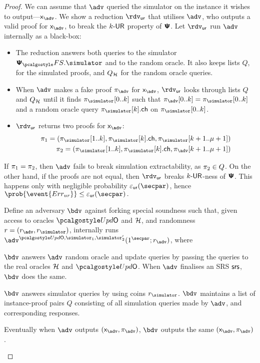 \begin{proof}
{  We can assume that $\advse$ queried the simulator on the instance it wishes to
  output---$\inp_{\advse}$. We show a reduction $\rdvur$ that utilises $\advse$,
  who outputs a valid proof for $\inp_{\advse}$, to break the ${k\text{-}\mathsf{UR}}$ property of
  $\bm{\mathsf{\Psi}}$. Let $\rdvur$ run $\advse$ internally as a black-box:
\begin{itemize}
	\item The reduction answers both queries to the simulator $\psfs.\simulator$ and to the random oracle. 
	It also keeps lists $Q$, for the simulated proofs, and $Q_{\mathcal{H}}$ for the random oracle queries. 
\item When $\advse$ makes a fake proof $\zkproof_{\advse}$ for $\inp_{\advse}$,
  $\rdvur$ looks through lists $Q$ and $Q_{\mathcal{H}}$ until it finds
  $\zkproof_{\simulator}[0..k]$ such that
  $\zkproof_{\advse}[0..k] = \zkproof_{\simulator}[0..k]$
  and a random oracle query $\zkproof_{\simulator}[k].\ch$ on
  $\zkproof_{\simulator}[0..k]$.
	\item $\rdvur$ returns two proofs for $\inp_{\advse}$:
	\begin{align*}
		\zkproof_1 = (\zkproof_{\simulator}[1..k],
		\zkproof_{\simulator}[k].\ch, \zkproof_{\simulator}[k + 1..\mu + 1])\\
		\zkproof_2 = (\zkproof_{\simulator}[1..k],
		\zkproof_{\simulator}[k].\ch, \zkproof_{\advse}[k + 1..\mu + 1])
	\end{align*}
	\end{itemize}  
	If $\pi_1 = \pi_2$, then $\advse$ fails to break simulation
  extractability, as $\pi_2 \in Q$. On the other hand, if the proofs are
  not equal, then $\rdvur$ breaks ${k\text{-}\mathsf{UR}}$-ness of $\bm{\mathsf{\Psi}}$. This happens only with
  negligible probability $\epsur(\secpar)$, hence \( \prob{\event{\errur}} \leq
  \epsur(\secpar)\,. \)
}
%
 Define an adversary $\bdv$ against forking special soundness such that,
given access to oracles $\initU$ and $\mathcal{H}$, and randomness $r = (r_\adv, \rsim)$,
internally runs $\advse^{\initU, \simulator_1, \simulator_2'} (1^\secpar; r_\adv)$,
where
\begin{compactenum}
\item $\bdv$ answers $\adv$ random oracle and update queries by passing the queries to the real
  oracles $\mathcal{H}$ and $\initU$. When $\adv$ finalises an SRS $\mathsf{srs}$, $\bdv$ does the same.
\item $\bdv$ answers simulator queries by using coins $\rsim$. $\bdv$ maintains a
  list of instance-proof pairs $Q$ consisting of all simulation queries made by
  $\adv$, and corresponding responses.
\item Eventually when $\adv$ outputs $(\inp_\advse, \zkproof_\advse)$, $\bdv$ outputs
  the same $(\inp_\advse, \zkproof_\advse)$.
\end{compactenum}


\end{proof}
